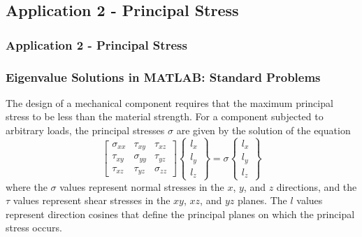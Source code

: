 \documentclass[fleqn]{beamer} %
\newcommand{\sectionIIsubsectionIVtitle}{Application 2 - Principal Stress}
\begin{document}
		\subsection{\sectionIIsubsectionIVtitle}\label{sectionIIsubsectionIV}

			\begin{frame}
				\frametitle{\sectionIIsubsectionIVtitle}
				\bigskip

				\frametitle{Eigenvalue Solutions in MATLAB: Standard Problems}
  
				  The design of a mechanical component requires that the maximum
				  principal stress to be less than the material strength. For a
				  component subjected to arbitrary loads, the principal stresses
				  $\sigma$ are given by the solution of the equation
				  \begin{displaymath}
				    \left[ \begin{array}{ccc}
				        \sigma_{xx} & \tau_{xy} & \tau_{xz} \\
				        \tau_{xy} & \sigma_{yy} & \tau_{yz} \\
				        \tau_{xz} & \tau_{yz} & \sigma_{zz}
				    \end{array} \right]
				    \left\{ \begin{array}{c}
				        l_x \\
				        l_y \\
				        l_z
				      \end{array} \right\} =
				    \sigma
				    \left\{ \begin{array}{c}
				        l_x \\
				        l_y \\
				        l_z
				      \end{array} \right\}
				  \end{displaymath}
				  where the $\sigma$ values represent normal stresses in the $x$, $y$,
				  and $z$ directions, and the $\tau$ values represent shear stresses
				  in the $xy$, $xz$, and $yz$ planes. The $l$ values represent
				  direction cosines that define the principal planes on which the
				  principal stress occurs.

				\btVFill 
			\end{frame}
\end{document}
